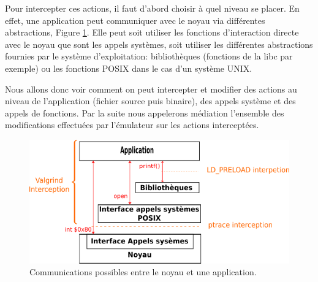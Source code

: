  
Pour intercepter ces actions, il faut d'abord choisir à quel niveau se placer.
En effet, une application peut communiquer avec le noyau via différentes
abstractions, Figure \ref{AS_Communication}. Elle peut soit utiliser les
fonctions d'interaction directe avec le noyau que sont les appels systèmes, soit
utiliser les différentes abstractions fournies par le système d'exploitation:
bibliothèques (fonctions de la libc par exemple) ou les fonctions POSIX dans le
cas d'un système UNIX.

Nous allons donc voir comment on peut intercepter et modifier des actions au
niveau de l'application (fichier source puis binaire), des appels système et
des appels de fonctions. Par la suite nous appelerons médiation l'ensemble des
modifications effectuées par l'émulateur sur les actions interceptées.

\begin{figure}[H]
 \centering
 \includegraphics[scale=0.75]{Pictures/png/Communication_application_noyau_v3.png}
 \caption{Communications possibles entre le noyau et une application.}
 \label{AS_Communication}
\end{figure}
